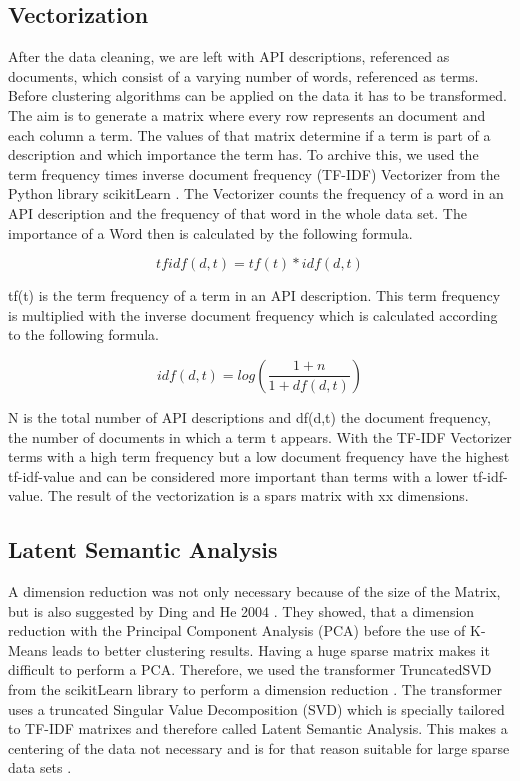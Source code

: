 \documentclass[a4paper]{IEEEtran}
\begin{document}
\subsection{Vectorization}
After the data cleaning, we are left with API descriptions, referenced as documents, which consist of a varying number of words, referenced as terms. Before clustering algorithms can be applied on the data it has to be transformed. The aim is to generate a matrix where every row represents an document and each column a term. The values of that matrix determine if a term is part of a description and which importance the term has. To archive this, we used the term frequency times inverse document frequency (TF-IDF) Vectorizer from the Python library scikitLearn \cite{scikit-learn}. The Vectorizer counts the frequency of a word in an API description and the frequency of that word in the whole data set. The importance of a Word then is calculated by the following formula.

\begin{equation*}
tfidf (d,t) = tf(t) * idf(d,t) 
\end{equation*}

tf(t) is the term frequency of a term in an API description. This term frequency is multiplied with the inverse document frequency which is calculated according to the following formula.

\begin{equation*}
idf (d,t) = log\left( \frac{1+n}{1+df(d,t)} \right)
\end{equation*}

N is the total number of API descriptions and df(d,t) the document frequency, the number of documents in which a term t appears. 
With the TF-IDF Vectorizer terms with a high term frequency but a low document frequency have the highest tf-idf-value and can be considered more important than terms with a lower tf-idf-value. The result of the vectorization is a spars matrix with xx dimensions.

\subsection{Latent Semantic Analysis}
A dimension reduction was not only necessary because of the size of the Matrix, but is also suggested by Ding and He 2004 \cite{ding2004k}. They showed, that a dimension reduction with the Principal Component Analysis (PCA) before the use of K-Means leads to better clustering  results. Having a huge sparse matrix makes it difficult to perform a PCA. Therefore, we used the transformer TruncatedSVD from the scikitLearn library to perform a dimension reduction \cite{scikit-learn}. The transformer uses a truncated Singular Value Decomposition (SVD) which is specially tailored to TF-IDF matrixes and therefore called Latent Semantic Analysis. This makes a centering of the data not necessary and is for that reason suitable for large sparse data sets \cite{albright2004taming}.
\end{document}
